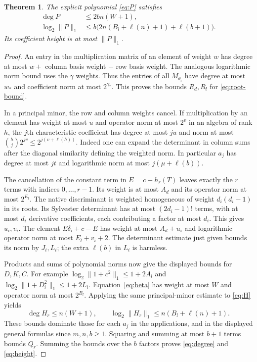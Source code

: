 \documentclass[11pt,a4paper]{article}
\newtheorem{theorem}{Theorem}[section]
\begin{document}
\begin{theorem}\label{thm:bounds}
The explicit polynomial \eqref{eq:P} satisfies
\begin{align}
 \deg P&\le 2bn(W+1),\label{eq:degree}\\
 \log_2\|P\|_1&\le
 b\bigl(2n(B_l+\ell(n)+1)+\ell(b+1)\bigr).\label{eq:height}
\end{align}
Its coefficient height is at most $\|P\|_1$.
\end{theorem}
\begin{proof}
An entry in the multiplication matrix of an element of weight
$w$ has degree at most $w+$ column basis weight $-$ row basis
weight. The analogous logarithmic norm bound uses the $\gamma$
weights. Thus the entries of all $M_{\theta_i}$ have degree at
most $w_*$ and coefficient norm at most $2^{\gamma_*}$.
This proves the bounds $R_d,R_l$ for \eqref{eq:root-bound}.

In a principal minor, the row and column weights cancel.
If multiplication by an element has weight at most $u$ and
operator norm at most $2^v$ in an algebra of rank $h$, the
$j$th characteristic coefficient has degree at most $ju$ and
norm at most $\binom hj2^{jv}\le2^{j(v+\ell(h))}$.
Indeed one can expand the determinant in column sums after
the diagonal similarity defining the weighted norm.
In particular $a_j$ has degree at most $jt$ and logarithmic
norm at most $j(\mu+\ell(b))$.

The cancellation of the constant term in
$E=c-h_r(T)$ leaves exactly the $r$ terms with indices
$0,\ldots,r-1$. Its weight is at most $A_d$ and its
operator norm at most $2^{E_l}$. The native discriminant
is weighted homogeneous of weight $d_i(d_i-1)$ in its
roots. Its Sylvester determinant has at most $(2d_i-1)!$
terms, with at most $d_i$ derivative coefficients, each
contributing a factor at most $d_i$. This gives $u_i,v_i$.
The element $E\delta_i+c-E$ has weight at most $A_d+u_i$
and logarithmic operator norm at most $E_l+v_i+2$.
The determinant estimate just given bounds its norm by
$J_i,L_i$; the extra $\ell(b)$ in $L_i$ is harmless.

Products and sums of polynomial norms now give the displayed
bounds for $D,K,C$. For example
$\log_2\|1+c^2\|_1\le1+2A_l$ and
$\log_2\|1+D_i^2\|_1\le1+2L_i$.
Equation~\eqref{eq:beta} has weight at most $W$ and
operator norm at most $2^{B_l}$. Applying the same
principal-minor estimate to \eqref{eq:H} yields
\[
 \deg H_r\le n(W+1),\qquad
 \log_2\|H_r\|_1\le n(B_l+\ell(n)+1).
\]
These bounds dominate those for each $a_j$ in the applications,
and in the displayed general formulas since $m,n,b\ge1$.
Squaring and summing at most $b+1$ terms bounds $Q_r$.
Summing the bounds over the $b$ factors proves
\eqref{eq:degree} and \eqref{eq:height}.
\end{proof}
\end{document}
